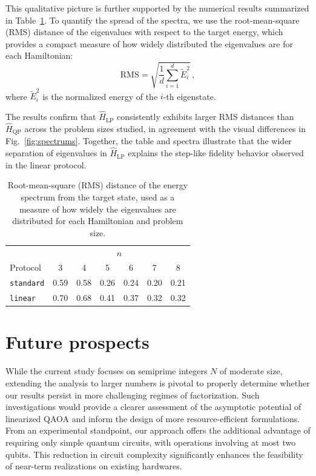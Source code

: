 This qualitative picture is further supported by the numerical results summarized in Table~\ref{table:rms}. To quantify the spread of the spectra, we use the root-mean-square (RMS) distance of the eigenvalues with respect to the target energy, which provides a compact measure of how widely distributed the eigenvalues are for each Hamiltonian:
\begin{equation}
    \textrm{RMS} = \sqrt{\dfrac{1}{d} \sum_{i=1}^{d}\widetilde{E}_i^2}\,,
    \label{eq:rms}
\end{equation}
where $\widetilde{E}_i^2$ is the normalized energy of the $i$-th eigenstate.

The results confirm that $\hat{H}_\mathrm{LP}$ consistently exhibits larger RMS distances than $\hat{H}_\mathrm{QP}$ across the problem sizes studied, in agreement with the visual differences in Fig.~\ref{fig:spectrums}. Together, the table and spectra illustrate that the wider separation of eigenvalues in $\hat{H}_\mathrm{LP}$ explains the step-like fidelity behavior observed in the linear protocol.

\begin{table}[h]
    \centering
    \begin{tabular}{@{}lcccccc@{}}
        \toprule
        & \multicolumn{6}{c}{$n$} \\
        \cmidrule(lr){2-7}
        Protocol            & 3     & 4     & 5     & 6     & 7     & 8 \\
        \midrule
        \texttt{standard}   & 0.59  & 0.58  & 0.26  & 0.24  & 0.20  & 0.21 \\
        \texttt{linear}     & 0.70  & 0.68  & 0.41  & 0.37  & 0.32  & 0.32 \\
        \bottomrule
    \end{tabular}
    \caption{Root-mean-square (RMS) distance of the energy spectrum from the target state, used as a measure of how widely the eigenvalues are distributed for each Hamiltonian and problem size.}
    \label{table:rms}
\end{table}

\section{Future prospects}

While the current study focuses on semiprime integers $N$ of moderate size, extending the analysis to larger numbers is pivotal to properly determine whether our results persist in more challenging regimes of factorization. Such investigations would provide a clearer assessment of the asymptotic potential of linearized QAOA and inform the design of more resource-efficient formulations. From an experimental standpoint, our approach offers the additional advantage of requiring only simple quantum circuits, with operations involving at most two qubits. This reduction in circuit complexity significantly enhances the feasibility of near-term realizations on existing hardwares.

